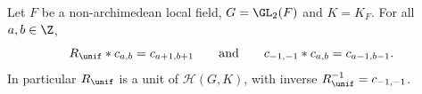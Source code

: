 Let $F$ be a non-archimedean local field, $G=\GL_2(F)$ and $K=K_F$. For all $a,b\in\Z$,
\[
  R_\unif*c_{a,b}=c_{a+1,b+1}\qquad\text{and}\qquad c_{-1,-1}*c_{a,b}=c_{a-1,b-1}.
\]
In particular $R_\unif$ is a unit of $\mathcal H(G,K)$, with inverse $R_\unif^{-1}=c_{-1,-1}$.
